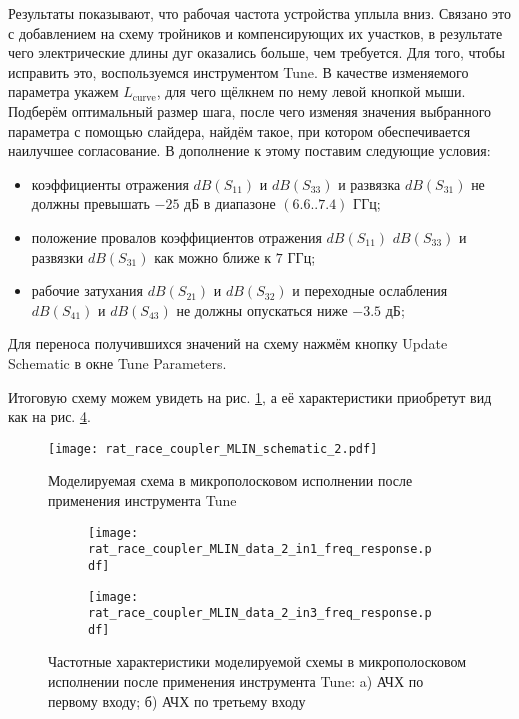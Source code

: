Результаты показывают, что рабочая частота устройства уплыла вниз. Связано это с добавлением на схему тройников и компенсирующих их участков, в результате чего электрические длины дуг оказались больше, чем требуется.
Для того, чтобы исправить это, воспользуемся инструментом Tune.
В качестве изменяемого параметра укажем $L_\text{curve}$, для чего щёлкнем по нему левой кнопкой мыши.
Подберём оптимальный размер шага, после чего изменяя значения выбранного параметра с помощью слайдера, найдём такое, при котором обеспечивается наилучшее согласование.
В дополнение к этому поставим следующие условия:
\begin{itemize}
    \item коэффициенты отражения $dB(S_{11})$ и $dB(S_{33})$ и развязка $dB(S_{31})$ не должны превышать $-25 \text{~дБ}$ в диапазоне $(6.6 .. 7.4) \text{~ГГц}$;
    \item положение провалов коэффициентов отражения $dB(S_{11})$ $dB(S_{33})$ и развязки $dB(S_{31})$ как можно ближе к $7 \text{~ГГц}$;
    \item рабочие затухания $dB(S_{21})$ и $dB(S_{32})$ и переходные ослабления $dB(S_{41})$ и $dB(S_{43})$ не должны опускаться ниже $-3.5 \text{~дБ}$;
\end{itemize}
Для переноса получившихся значений на схему нажмём кнопку Update Schematic в окне Tune Parameters.

Итоговую схему можем увидеть на рис. \ref{fig:rat_race_coupler_MLIN_schematic_2}, а её характеристики приобретут вид как на рис. \ref{fig:rat_race_coupler_MLIN_data_2}.

\begin{figure}
    \centering
    \texttt{[image: rat\_race\_coupler\_MLIN\_schematic\_2.pdf]}
    \caption{Моделируемая схема в микрополосковом исполнении после применения инструмента Tune}
    \label{fig:rat_race_coupler_MLIN_schematic_2}
\end{figure}

\begin{figure}[!ht]
    \centering
    \begin{subfigure}[b]{0.45\textwidth}
        \centering
        \texttt{[image: rat\_race\_coupler\_MLIN\_data\_2\_in1\_freq\_response.pdf]}
        \caption{}
        \label{fig:rat_race_coupler_MLIN_data_2_in1_freq_response}
    \end{subfigure}
    \hfill
    \begin{subfigure}[b]{0.45\textwidth}
        \centering
        \texttt{[image: rat\_race\_coupler\_MLIN\_data\_2\_in3\_freq\_response.pdf]}
        \caption{}
        \label{fig:rat_race_coupler_MLIN_data_2_in3_freq_response}
    \end{subfigure}
    \caption{
        Частотные характеристики моделируемой схемы в микрополосковом исполнении после применения инструмента Tune:
        a) АЧХ по первому входу;
        б) АЧХ по третьему входу
    }
    \label{fig:rat_race_coupler_MLIN_data_2}
\end{figure}

